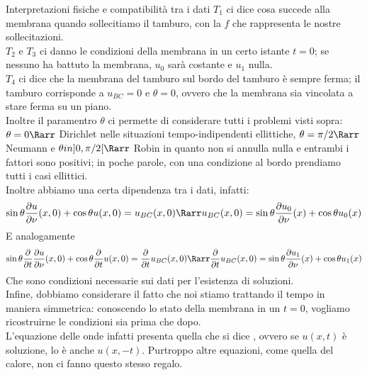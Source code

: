 \documentclass{book}
\begin{document}
\begin{remark}{Interpretazioni fisiche e compatibilità tra i dati}{}
    $T_1$ ci dice cosa succede alla membrana quando sollecitiamo il tamburo, con la $f$ che rappresenta le nostre sollecitazioni.\\
    $T_2$ e $T_3$ ci danno le condizioni della membrana in un certo istante $t=0$; se nessuno ha battuto la membrana, $u_0$ sarà costante e $u_1$ nulla.\\
    $T_4$ ci dice che la membrana del tamburo sul bordo del tamburo è sempre ferma; il tamburo corrisponde a $u_{BC} = 0$ e $\theta = 0$, ovvero che la membrana sia vincolata a stare ferma su un piano.\\
    Inoltre il paramentro $\theta$ ci permette di considerare tutti i problemi visti sopra: $\theta = 0 \Rarr$ Dirichlet nelle situazioni tempo-indipendenti ellittiche, $\theta = \pi/2\Rarr$ Neumann e $\theta in ]0,\pi/2[\Rarr$ Robin in quanto non si annulla nulla e entrambi i fattori sono positivi; in poche parole, con una condizione al bordo prendiamo tutti i casi ellittici.\\
    Inoltre abbiamo una certa dipendenza tra i dati, infatti:
    \[\sin\theta \frac{\partial u}{\partial \nu}(x,0) + \cos\theta u(x,0) = u_{BC}(x,0)\Rarr u_{BC}(x,0) = \sin\theta \frac{\partial u_0}{\partial \nu}(x) + \cos\theta u_0(x)\]
    E analogamente
    \[\sin\theta\frac{\partial}{\partial t} \frac{\partial u}{\partial \nu}(x,0) + \cos\theta\frac{\partial}{\partial t} u(x,0) =\frac{\partial}{\partial t} u_{BC}(x,0) \Rarr \frac{\partial}{\partial t} u_{BC}(x,0) =  \sin\theta \frac{\partial u_1}{\partial \nu}(x) + \cos\theta u_1(x)\]
    Che sono condizioni necessarie sui dati per l'esistenza di soluzioni.\\
    Infine, dobbiamo considerare il fatto che noi stiamo trattando il tempo in maniera simmetrica: conoscendo lo stato della membrana in un $t=0$, vogliamo ricostruirne le condizioni sia prima che dopo.\\
    L'equazione delle onde infatti presenta quella che si dice , ovvero se $u(x,t)$ è soluzione, lo è anche $u(x,-t)$. Purtroppo altre equazioni, come quella del calore, non ci fanno questo stesso regalo.
\end{remark}
\end{document}
